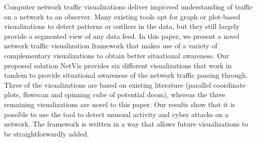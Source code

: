 Computer network traffic visualizations deliver improved understanding of traffic on a network to an observer. 
Many existing tools opt for graph or plot-based visualizations to detect patterns or outliers in the data, but they still largely
provide a segmented view of any data feed. In this paper, we present a novel network traffic visualization framework that 
makes use of a variety of complementary visualizations to obtain better situational awareness. Our proposed solution NetVis provides 
six different visualizations that work in tandem to provide situational awareness of the network traffic passing through. Three of 
the visualizations are based on existing literature (parallel coordinate plots, flowscan and spinning cube of potential doom), whereas the 
three remaining visualizations are novel to this paper. Our results show that it is possible to use the tool to detect unusual activity 
and cyber attacks on a network. The framework is written in a way that allows future visualizations to be straightforwardly added. 
